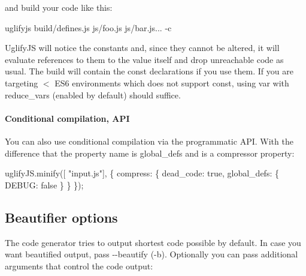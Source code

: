 and build your code like this\+: \begin{DoxyVerb}uglifyjs build/defines.js js/foo.js js/bar.js... -c
\end{DoxyVerb}


Uglify\+JS will notice the constants and, since they cannot be altered, it will evaluate references to them to the value itself and drop unreachable code as usual. The build will contain the {\ttfamily const} declarations if you use them. If you are targeting $<$ E\+S6 environments which does not support {\ttfamily const}, using {\ttfamily var} with {\ttfamily reduce\+\_\+vars} (enabled by default) should suffice.

\label{_codegen-options}%


\paragraph*{Conditional compilation, A\+PI}

You can also use conditional compilation via the programmatic A\+PI. With the difference that the property name is {\ttfamily global\+\_\+defs} and is a compressor property\+:


\begin{DoxyCode}
uglifyJS.minify([ "input.js"], \{
    compress: \{
        dead\_code: true,
        global\_defs: \{
            DEBUG: false
        \}
    \}
\});
\end{DoxyCode}


\subsection*{Beautifier options}

The code generator tries to output shortest code possible by default. In case you want beautified output, pass {\ttfamily -\/-\/beautify} ({\ttfamily -\/b}). Optionally you can pass additional arguments that control the code output\+:


